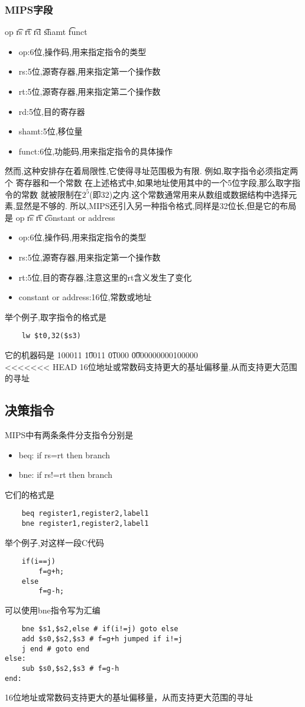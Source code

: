 \documentclass{ctexart}
\begin{document}
\subsubsection{MIPS字段}
op \t rs \t rt \t rd \t shamt \t funct \\
\begin{itemize}
	\item op:6位,操作码,用来指定指令的类型
	\item rs:5位,源寄存器,用来指定第一个操作数
	\item rt:5位,源寄存器,用来指定第二个操作数
	\item rd:5位,目的寄存器
	\item shamt:5位,移位量
	\item funct:6位,功能码,用来指定指令的具体操作
\end{itemize}
然而,这种安排存在着局限性,它使得寻址范围极为有限.
例如,取字指令必须指定两个
寄存器和一个常数 在上述格式中,如果地址使用其中的一个5位字段,那么取字指令的常数
就被限制在$2^5$(即32)之内.这个常数通常用来从数组或数据结构中选择元素,显然是不够的.
所以,MIPS还引入另一种指令格式,同样是32位长,但是它的布局是
op \t rs \t rt \t constant or address \\
\begin{itemize}
	\item op:6位,操作码,用来指定指令的类型
	\item rs:5位,源寄存器,用来指定第一个操作数
	\item rt:5位,目的寄存器,注意这里的rt含义发生了变化
	\item constant or address:16位,常数或地址
\end{itemize}
举个例子,取字指令的格式是
\begin{lstlisting}
    lw $t0,32($s3)
\end{lstlisting}
它的机器码是
100011 \t 10011 \t 01000 \t 0000000000100000 \\
<<<<<<< HEAD
16位地址或常数码支持更大的基址偏移量,从而支持更大范围的寻址\\
\subsection{决策指令}
MIPS中有两条条件分支指令分别是
\begin{itemize}
	\item beq: if rs=rt then branch
	\item bne: if rs!=rt then branch
\end{itemize}
它们的格式是
\begin{lstlisting}
    beq register1,register2,label1
    bne register1,register2,label1
\end{lstlisting}

举个例子,对这样一段C代码
\begin{lstlisting}
    if(i==j)
        f=g+h;
    else
        f=g-h;
\end{lstlisting}
可以使用bne指令写为汇编
\begin{lstlisting}
    bne $s1,$s2,else # if(i!=j) goto else
    add $s0,$s2,$s3 # f=g+h jumped if i!=j
    j end # goto end
else:
    sub $s0,$s2,$s3 # f=g-h
end:
\end{lstlisting}
16位地址或常数码支持更大的基址偏移量，从而支持更大范围的寻址\\
\end{document}
